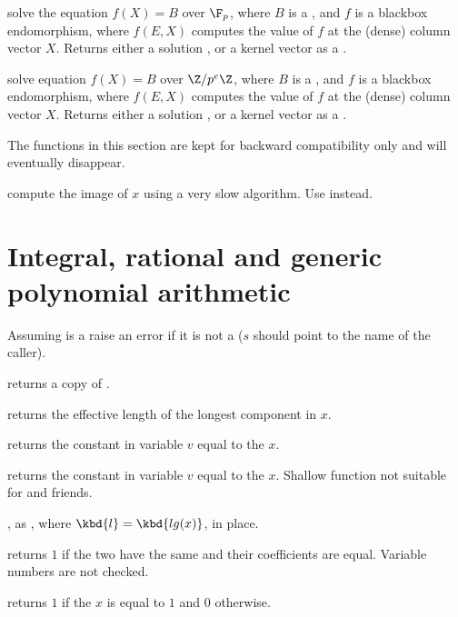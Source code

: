 solve the equation $f(X) = B$ over $\F_p$, where $B$ is a , and $f$
is a blackbox endomorphism, where $f(E, X)$ computes the value of $f$ at the
(dense) column vector $X$. Returns either a solution , or a kernel
vector as a .

solve equation $f(X) = B$ over $\Z/p^e\Z$, where $B$ is a , and $f$ is a
blackbox endomorphism, where $f(E, X)$ computes the value of $f$ at the
(dense) column vector $X$. Returns either a solution , or a kernel
vector as a .


The functions in this section are kept for backward compatibility only
and will eventually disappear.

 compute the image of $x$ using a very slow
algorithm. Use  instead.

\section{Integral, rational and generic polynomial arithmetic}


 Assuming  is a 
raise an error if it is not a  ($s$ should point to the name of the
caller).

 returns a copy of .

 returns the effective length of the longest
component in $x$.

 returns the constant  in variable
$v$ equal to the  $x$.

 returns the constant  in
variable $v$ equal to the  $x$. Shallow function not suitable for
 and friends.

, as , where
$\kbd{l} = \kbd{lg(x)}$, in place.

 returns $1$ if the two  have
the same  and their coefficients are equal. Variable numbers are
not checked.

 returns $1$ if the  $x$ is equal to $1$
and $0$ otherwise.

